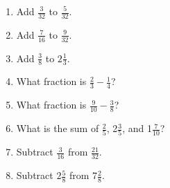\documentclass[12pt]{article}
\begin{document}
\begin{enumerate}
\item Add $\frac{3}{32}$ to $\frac{5}{32}$. 
\spacing

\item Add $\frac{7}{16}$ to $\frac{9}{32}$. 
\spacing

\item Add $\frac{3}{8}$ to $2\frac{1}{3}$. 
\spacing

\item What fraction is $\frac{2}{3} - \frac{1}{4}$? 
\spacing

\item What fraction is $\frac{9}{10} - \frac{3}{8}$? 
\spacing

\item What is the sum of $\frac{2}{5}$, 2$\frac{3}{5}$, and 1$\frac{7}{10}$? 
\spacing

\item Subtract $\frac{3}{16}$ from $\frac{21}{32}$. 
\spacing

\item Subtract $2\frac{5}{8}$ from $7\frac{2}{8}$. 
\spacing

\end{enumerate}
\end{document}
